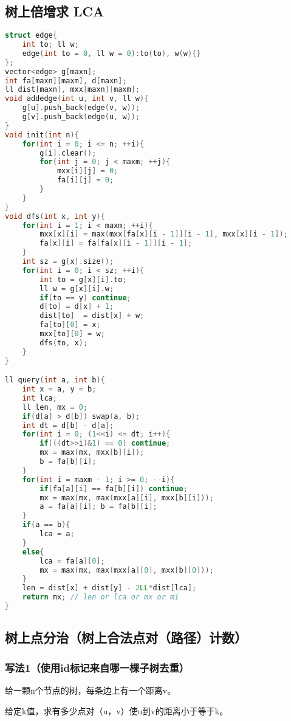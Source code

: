 \subsection{树上倍增求 LCA}

\begin{lstlisting}[language=C++]
struct edge{
    int to; ll w;
    edge(int to = 0, ll w = 0):to(to), w(w){}
};
vector<edge> g[maxn];
int fa[maxn][maxm], d[maxn];
ll dist[maxn], mxx[maxn][maxm];
void addedge(int u, int v, ll w){
    g[u].push_back(edge(v, w));
    g[v].push_back(edge(u, w));
}
void init(int n){
    for(int i = 0; i <= n; ++i){
        g[i].clear();
        for(int j = 0; j < maxm; ++j){
            mxx[i][j] = 0;
            fa[i][j] = 0;
        }
    }
}
void dfs(int x, int y){
    for(int i = 1; i < maxm; ++i){
        mxx[x][i] = max(mxx[fa[x][i - 1]][i - 1], mxx[x][i - 1]);
        fa[x][i] = fa[fa[x][i - 1]][i - 1];
    }
    int sz = g[x].size();
    for(int i = 0; i < sz; ++i){
        int to = g[x][i].to;
        ll w = g[x][i].w;
        if(to == y) continue;
        d[to] = d[x] + 1;
        dist[to]  = dist[x] + w;
        fa[to][0] = x;
        mxx[to][0] = w;
        dfs(to, x);
    }
}

ll query(int a, int b){
    int x = a, y = b;
    int lca;
    ll len, mx = 0;
    if(d[a] > d[b]) swap(a, b);
    int dt = d[b] - d[a];
    for(int i = 0; (1<<i) <= dt; i++){
        if(((dt>>i)&1) == 0) continue;
        mx = max(mx, mxx[b][i]);
        b = fa[b][i];
    }
    for(int i = maxm - 1; i >= 0; --i){
        if(fa[a][i] == fa[b][i]) continue;
        mx = max(mx, max(mxx[a][i], mxx[b][i]));
        a = fa[a][i]; b = fa[b][i];
    }
    if(a == b){
        lca = a;
    }
    else{
        lca = fa[a][0];
        mx = max(mx, max(mxx[a][0], mxx[b][0]));
    }
    len = dist[x] + dist[y] - 2LL*dist[lca];
    return mx; // len or lca or mx or mi
}
\end{lstlisting}

\subsection{树上点分治（树上合法点对（路径）计数）}

\subsubsection{写法1（使用id标记来自哪一棵子树去重）}

给一颗n个节点的树，每条边上有一个距离v。

给定k值，求有多少点对（u，v）使u到v的距离小于等于k。

